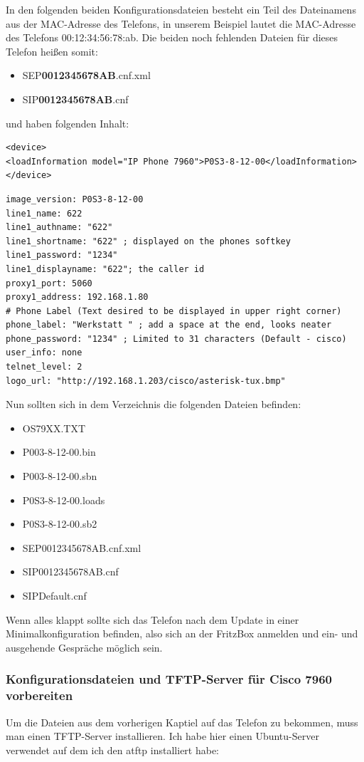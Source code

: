 \documentclass[a4paper,12pt]{scrbook}
\begin{document}
In den folgenden beiden Konfigurationsdateien besteht ein Teil des Dateinamens aus der MAC-Adresse des Telefons, in unserem Beispiel lautet die MAC-Adresse des Telefons 00:12:34:56:78:ab.
Die beiden noch fehlenden Dateien für dieses Telefon heißen somit:
\begin{itemize}
 \item SEP\textbf{0012345678AB}.cnf.xml
 \item SIP\textbf{0012345678AB}.cnf
\end{itemize}
und haben folgenden Inhalt:

\begin{lstlisting}[caption={SEP\textbf{0012345678AB}.cnf.xml},label=lst:7960sep0012345678abcnfxml]
<device>
<loadInformation model="IP Phone 7960">P0S3-8-12-00</loadInformation>
</device>
\end{lstlisting}

\begin{lstlisting}[caption={SIP\textbf{0012345678AB}.cnf},label=lst:7960sip0012345678abcnf]
image_version: P0S3-8-12-00
line1_name: 622
line1_authname: "622"
line1_shortname: "622" ; displayed on the phones softkey
line1_password: "1234"
line1_displayname: "622"; the caller id
proxy1_port: 5060
proxy1_address: 192.168.1.80
# Phone Label (Text desired to be displayed in upper right corner)
phone_label: "Werkstatt " ; add a space at the end, looks neater
phone_password: "1234" ; Limited to 31 characters (Default - cisco)
user_info: none
telnet_level: 2
logo_url: "http://192.168.1.203/cisco/asterisk-tux.bmp"
\end{lstlisting}

Nun sollten sich in dem Verzeichnis die folgenden Dateien befinden:
\begin{itemize}
 \item OS79XX.TXT  
 \item P003-8-12-00.bin  
 \item P003-8-12-00.sbn  
 \item P0S3-8-12-00.loads
 \item P0S3-8-12-00.sb2
 \item SEP0012345678AB.cnf.xml
 \item SIP0012345678AB.cnf
 \item SIPDefault.cnf
\end{itemize}
Wenn alles klappt sollte sich das Telefon nach dem Update in einer Minimalkonfiguration befinden, also sich an der FritzBox anmelden und ein- und ausgehende Gespräche möglich sein.

\subsubsection{Konfigurationsdateien und TFTP-Server für Cisco 7960 vorbereiten}
Um die Dateien aus dem vorherigen Kaptiel auf das Telefon zu bekommen, muss man einen TFTP-Server installieren. 
Ich habe hier einen Ubuntu-Server verwendet auf dem ich den atftp installiert habe:
\end{document}
